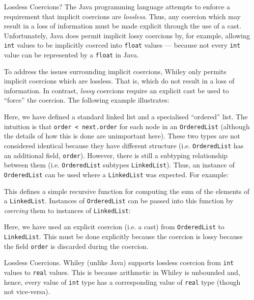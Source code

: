 \begin{insight}{Lossless Coercions?}
The Java programming language attempts to enforce a requirement that implicit coercions are {\em lossless}.  Thus, any coercion which may result in a loss of information must be made explicit through the use of a cast.  Unfortunately, Java does permit implicit lossy coercions by, for example, allowing \lstinline{int} values to be implicitly coerced into \lstinline{float} values --- because not every \lstinline{int} value can be represented by a \lstinline{float} in Java.
\end{insight}

To address the issues surrounding implicit coercions, Whiley only permits implicit coercions which are lossless.  That is, which do not result in a loss of information.  In contrast, {\em lossy} coercions require an explicit cast be used to ``force'' the coercion.  The following example illustrates:



Here, we have defined a standard linked list and a specialised
``ordered'' list.  The intuition is that \lstinline{order < next.order} for each node in an \lstinline{OrderedList} (although the details of how this is done are unimportant here).   These two types are not considered identical because they have different structure (i.e. \lstinline{OrderedList} has an additional field, \lstinline{order}).  However, there is still a subtyping relationship between them (i.e. \lstinline{OrderedList} subtypes \lstinline{LinkedList}).  Thus, an instance of \lstinline{OrderedList} can be used where a \lstinline{LinkedList} was expected.  For example:



This defines a simple recursive function for computing the sum of the elements of a \lstinline{LinkedList}.  Instances of \lstinline{OrderedList} can be passed into this function by {\em coercing} them to instances of \lstinline{LinkedList}:



Here, we have used an explicit coercion (i.e. a cast) from \lstinline{OrderedList} to \lstinline{LinkedList}.  This must be done explicitly because the coercion is lossy because the field \lstinline{order} is discarded during the coercion.

\begin{insight}{Lossless Coercions.}
Whiley (unlike Java) supports lossless coercion from \lstinline{int} values to \lstinline{real} values.  This is because arithmetic in Whiley is unbounded and, hence, every value of \lstinline{int} type has a corresponding value of \lstinline{real} type (though not vice-versa).
\end{insight}

